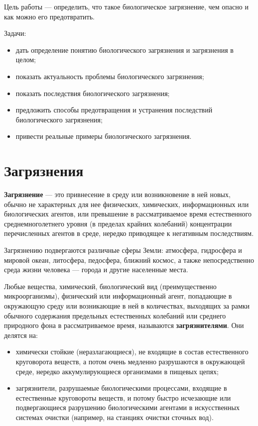 \documentclass[a4paper, 12pt]{extarticle}
\begin{document}
Цель работы --- определить, что такое биологическое загрязнение, чем опасно и как можно его предотвратить.

Задачи:
\begin{itemize}
    \item дать определение понятию биологического загрязнения и загрязнения в целом;
    \item показать актуальность проблемы биологического загрязнения;
    \item показать последствия биологического загрязнения;
    \item предложить способы предотвращения и устранения последствий биологического загрязнения;
    \item привести реальные примеры биологического загрязнения.
\end{itemize}

\section{Загрязнения}

\textbf{Загрязнение} --- это привнесение в среду или возникновение в ней новых, обычно не характерных для нее физических, химических, информационных или биологических агентов, или превышение в рассматриваемое время естественного среднемноголетнего уровня (в пределах крайних колебаний) концентрации перечисленных агентов в среде, нередко приводящее к негативным последствиям.

Загрязнению подвергаются различные сферы Земли: атмосфера, гидросфера и мировой океан, литосфера, педосфера, ближний космос, а также непосредственно среда жизни человека --- города и другие населенные места.

Любые вещества, химический, биологический вид (преимущественно микроорганизмы), физический или информационный агент, попадающие в окружающую среду или возникающие в ней в количествах, выходящих за рамки обычного содержания предельных естественных колебаний или среднего природного фона в рассматриваемое время, называются \textbf{загрязнителями}. Они делятся на:
\begin{itemize}
    \item химически стойкие (неразлагающиеся), не входящие в состав естественного круговорота веществ, а потом очень медленно разрушаются в окружающей среде, нередко аккумулирующиеся организмами в пищевых цепях;
    \item загрязнители, разрушаемые биологическими процессами, входящие в естественные круговороты веществ, и потому быстро исчезающие или подвергающиеся разрушению биологическими агентами в искусственных системах очистки (например, на станциях очистки сточных вод).
\end{itemize}
\end{document}
